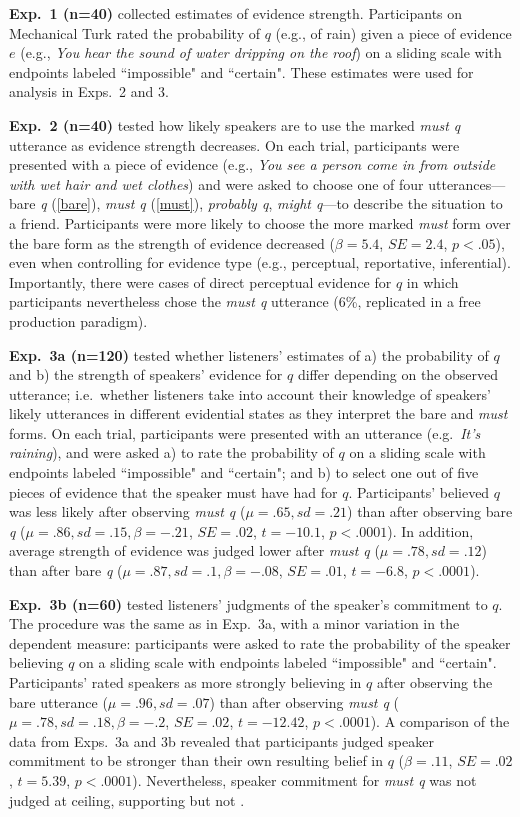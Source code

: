 \documentclass[11pt]{article}
\begin{document}
\textbf{Exp.~1 (n=40)} collected estimates of evidence strength. Participants on Mechanical Turk rated the probability of $q$ (e.g., of rain) given a piece of evidence $e$ (e.g., \emph{You hear the sound of water dripping on the roof}) on a sliding scale with endpoints labeled ``impossible" and ``certain". These estimates were used for analysis in Exps.~2 and 3.

\textbf{Exp.~2 (n=40)} tested how likely speakers are to use the marked \emph{must q} utterance as evidence strength decreases. On each trial, participants were presented with a piece of evidence (e.g., \emph{You see a person come in from outside with wet hair and wet clothes}) and were asked to choose one of four utterances---bare \emph{q} (\ref{bare}), \emph{must q} (\ref{must}), \emph{probably q}, \emph{might q}---to describe the situation to a friend. Participants were more likely to choose the more marked \emph{must} form over the bare form as the strength of evidence decreased ($\beta=5.4$, $SE=2.4$, $p<.05$), even when controlling for evidence type (e.g., perceptual, reportative, inferential). Importantly, there were cases of direct perceptual evidence for $q$ in which participants nevertheless chose the \emph{must q} utterance (6\%, replicated in a free production paradigm).

\textbf{Exp.~3a (n=120)} tested whether listeners' estimates of a) the probability of $q$ and b) the strength of speakers' evidence for $q$ differ depending on the observed utterance; i.e.~whether listeners take into account their knowledge of speakers' likely utterances in different evidential states as they interpret the bare and \emph{must} forms. On each trial, participants were presented with an utterance (e.g.~\emph{It's raining}), and were asked a) to rate the probability of $q$ on a sliding scale with endpoints labeled ``impossible" and ``certain"; and b) to select one out of five pieces of evidence that the speaker must have had for $q$. Participants' believed $q$ was less likely after observing  \emph{must q} ($\mu=.65,sd=.21$) than after observing bare \emph{q} ($\mu=.86,sd=.15, \beta=-.21$, $SE=.02$, $t=-10.1$, $p<.0001$). In addition, average strength of evidence was judged lower after \emph{must q} ($\mu=.78,sd=.12$) than after bare \emph{q} ($\mu=.87,sd=.1, \beta=-.08$, $SE=.01$, $t=-6.8$, $p<.0001$).

\textbf{Exp.~3b (n=60)} tested listeners' judgments of the speaker's commitment to $q$. The procedure was the same as in Exp.~3a, with a minor variation in the dependent measure: participants were asked to rate the probability of the speaker believing $q$ on a sliding scale with endpoints labeled ``impossible" and ``certain". Participants' rated speakers as more strongly believing in $q$ after observing the bare utterance ($\mu=.96,sd=.07$) than after observing  \emph{must q}  ($\mu=.78,sd=.18, \beta=-.2$, $SE=.02$, $t=-12.42$, $p<.0001$). A comparison of the data from Exps.~3a and 3b revealed that participants judged speaker commitment to be stronger than their own resulting belief in $q$ ($\beta=.11$, $SE=.02$, $t=5.39$, $p<.0001$). Nevertheless, speaker commitment for \emph{must q} was not judged at ceiling, supporting \citep{lassiter2014salt} but not \citep{vonfintelgillies2010}.
\end{document}
